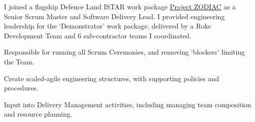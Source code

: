 I joined a flagship Defence Land ISTAR work package \href{https://www.roke.co.uk/news/digitising-land-tactical-istar}{Project ZODIAC} as a Senior Scrum Master and Software Delivery Lead. I provided engineering leadership for the `Demonstrator' work package, delivered by a Roke Development Team and 6 sub-contractor teams I coordinated.
\vspace{0.25em}
\begin{tightemize}
  \item Responsible for running all Scrum Ceremonies, and removing `blockers' limiting the Team.
  \item Create scaled-agile engineering structures, with supporting policies and procedures.
  \item Input into Delivery Management activities, including managing team composition and resource planning.
\end{tightemize}
\sectionsep{}
